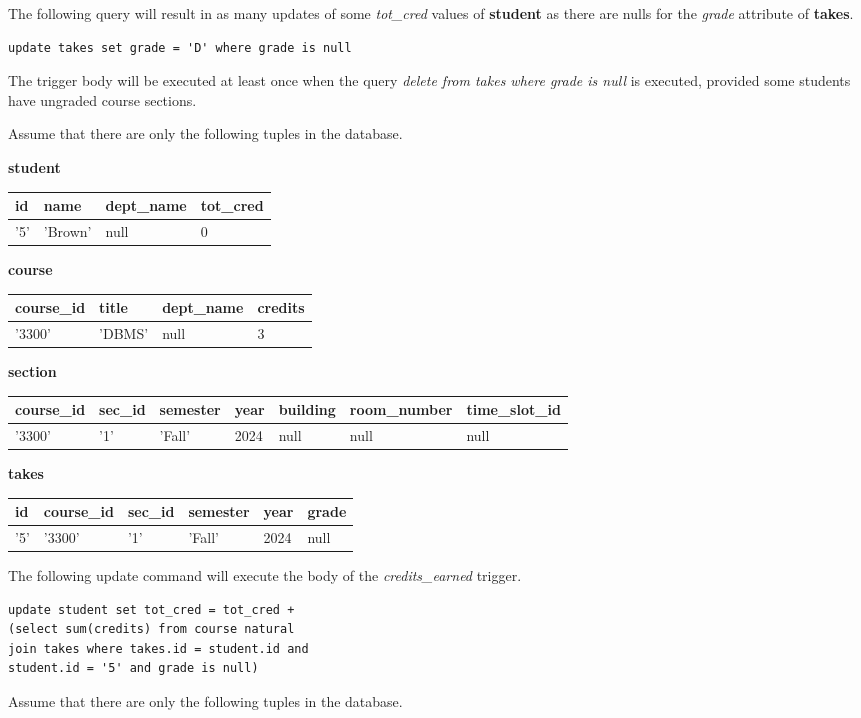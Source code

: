 \documentclass[12pt]{exam}
\begin{document}
\begin{questions}
\begin{samepage}
\begin{checkboxes}
\CorrectChoice The following query will result in as many updates of some \textit{tot\_cred} values of \textbf{student} 
as there are nulls for the \textit{grade} attribute of \textbf{takes}.
\begin{verbatim}
update takes set grade = 'D' where grade is null
\end{verbatim}

\choice The trigger body will be executed at least once when the query \textit{delete from takes where grade is null} 
is executed, provided some students have ungraded course sections.

\choice Assume that there are only the following tuples in the database.

\textbf{student}

\begin{tabular}{|l|l|l|l|}
\hline
id & name & dept\_name & tot\_cred \\
\hline
'5' & 'Brown' & null & 0 \\
\hline
\end{tabular}

\textbf{course}

\begin{tabular}{|l|l|l|l|}
\hline
course\_id & title & dept\_name & credits \\
\hline
'3300' & 'DBMS' & null & 3 \\
\hline
\end{tabular}

\textbf{section}

\begin{tabular}{|l|l|l|l|l|l|l|}
\hline
course\_id & sec\_id & semester & year & building & room\_number & time\_slot\_id \\
\hline
'3300' & '1' & 'Fall' & 2024 & null & null & null \\
\hline
\end{tabular}

\textbf{takes}

\begin{tabular}{|l|l|l|l|l|l|}
\hline
id & course\_id & sec\_id & semester & year & grade \\
\hline
'5' & '3300' & '1' & 'Fall' & 2024 & null \\
\hline
\end{tabular}

The following update command will execute the body of the \textit{credits\_earned} trigger.
\begin{verbatim}
update student set tot_cred = tot_cred + 
(select sum(credits) from course natural 
join takes where takes.id = student.id and 
student.id = '5' and grade is null)
\end{verbatim}
\choice Assume that there are only the following tuples in the database.


\end{checkboxes}
\end{samepage}
\end{questions}
\end{document}
